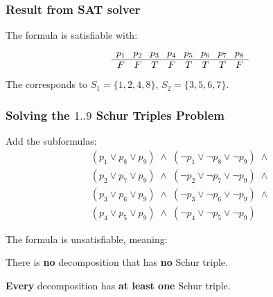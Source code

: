 \documentclass{beamer}
\begin{document}

\begin{frame}
\frametitle{Result from SAT solver}
The formula is satisfiable with:
\[
\begin{array}{c@{\hspace{8pt}}c@{\hspace{8pt}}c@{\hspace{8pt}}c@{\hspace{8pt}}c@{\hspace{8pt}}c@{\hspace{8pt}}c@{\hspace{8pt}}c}
p_1&p_2&p_3&p_4&p_5&p_6&p_7&p_8\\\hline
F&F&T&F&T&T&T&F
\end{array}
\]
The corresponds to 
$S_1=\{1,2,4,8\}$, $S_2=\{3,5,6,7\}$.

\end{frame}


\begin{frame}
\frametitle{Solving the $1..9$ Schur Triples Problem}

Add the subformulas:
\[
\begin{array}{l}
(p_1 \vee p_8 \vee p_9) \;\wedge\; (\neg p_1 \vee \neg p_8 \vee \neg p_9) \;\wedge \\
(p_2 \vee p_7 \vee p_9) \;\wedge\; (\neg p_2 \vee \neg p_7 \vee \neg p_9) \;\wedge \\
(p_3 \vee p_6 \vee p_9) \;\wedge\; (\neg p_3 \vee \neg p_6 \vee \neg p_9) \;\wedge \\
(p_4 \vee p_5 \vee p_9) \;\wedge\; (\neg p_4 \vee \neg p_5 \vee \neg p_9)
\end{array}
\]

\pause

\bigskip

The formula is unsatisfiable, meaning:

\smallskip

There is \textbf{\Large no} decomposition that has \textbf{\Large no} Schur triple. 

\smallskip

\textbf{\Large Every} decomposition has \textbf{\Large at least one} Schur triple. 
\end{frame}

\end{document}
